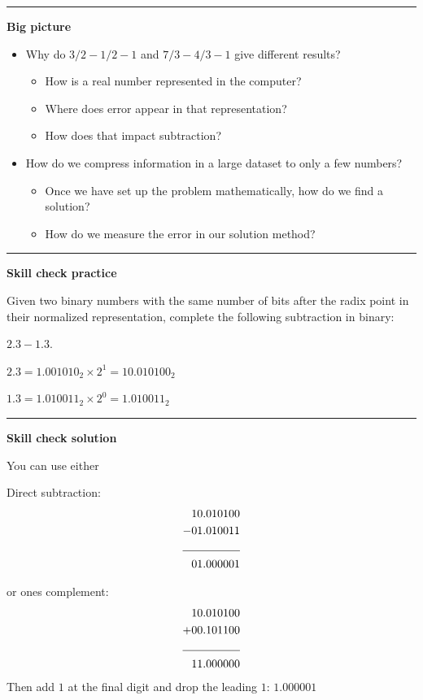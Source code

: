 \documentclass[12pt,letterpaper,noanswers]{exam}
\begin{document}
\hrule
\vspace{0.2cm}


\noindent\textbf{Big picture}
\begin{itemize}
    \itemsep0pt
\item Why do $3/2 - 1/2 - 1$ and $7/3 - 4/3 - 1$ give different results?
\begin{itemize}
    \itemsep0pt
    \item How is a real number represented in the computer?
    \item Where does error appear in that representation?
    \item How does that impact subtraction?
\end{itemize}
\item How do we compress information in a large dataset to only a few numbers?  
\begin{itemize}
    \item Once we have set up the problem mathematically, how do we find a solution?
    \item How do we measure the error in our solution method?
\end{itemize}
\end{itemize}

\vspace{0.2cm}
\hrule
\vspace{0.2cm}

\noindent \textbf{Skill check practice}

Given two binary numbers with the same number of bits after the radix point in their normalized representation, complete the following subtraction in binary:

$2.3 - 1.3$.

$2.3 = 1.001010_2\times 2^1 = 10.010100_2$

$1.3 = 1.010011_2 \times 2^0 = 1.010011_2$


\vspace{0.2cm}
\hrule
\vspace{0.2cm}

\noindent \textbf{Skill check solution}

You can use either

Direct subtraction:
\begin{align*}
&10.010100 \\
- &01.010011 \\
\cline{1-2}
&01.000001
\end{align*}

or ones complement:
\begin{align*}
&10.010100 \\
+ &00.101100 \\
\cline{1-2}
&11.000000
\end{align*}
Then add $1$ at the final digit and drop the leading $1$:
$1.000001$
\end{document}
